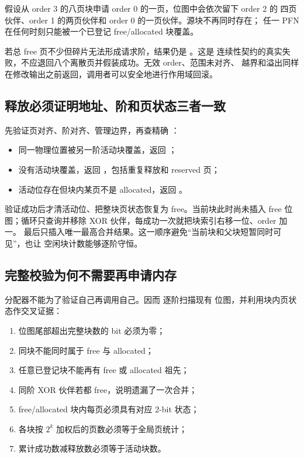 假设从 order 3 的八页块申请 order 0 的一页，位图中会依次留下 order 2 的
四页伙伴、order 1 的两页伙伴和 order 0 的一页伙伴。源块不再同时存在；
任一 PFN 在任何时刻只能被一个已登记 free/allocated 块覆盖。

若总 free 页不少但碎片无法形成请求阶，结果仍是 。这是
连续性契约的真实失败，不应退回八个离散页并假装成功。无效 order、范围未对齐、
越界和溢出同样在修改输出之前返回，调用者可以安全地进行作用域回滚。

\subsection{释放必须证明地址、阶和页状态三者一致}

 先验证页对齐、阶对齐、管理边界，再查精确
：

\begin{itemize}
  \item 同一物理位置被另一阶活动块覆盖，返回
        ；
  \item 没有活动块覆盖，返回 ，包括重复释放和
        reserved 页；
  \item 活动位存在但块内某页不是 allocated，返回 。
\end{itemize}

验证成功后才清活动位、把整块页状态恢复为 free。当前块此时尚未插入 free
位图；循环只查询并移除 XOR 伙伴，每成功一次就把块索引右移一位、order 加一。
最后只插入唯一最高合并结果。这一顺序避免“当前块和父块短暂同时可见”，也让
空闲块计数能够逐阶守恒。

\subsection{完整校验为何不需要再申请内存}

分配器不能为了验证自己再调用自己。因而  逐阶扫描现有
位图，并利用块内页状态作交叉证据：

\begin{enumerate}
  \item 位图尾部超出完整块数的 bit 必须为零；
  \item 同块不能同时属于 free 与 allocated；
  \item 任意已登记块不能再有 free 或 allocated 祖先；
  \item 同阶 XOR 伙伴若都 free，说明遗漏了一次合并；
  \item free/allocated 块内每页必须具有对应 2-bit 状态；
  \item 各块按 \(2^k\) 加权后的页数必须等于全局页统计；
  \item 累计成功数减释放数必须等于活动块数。
\end{enumerate}

